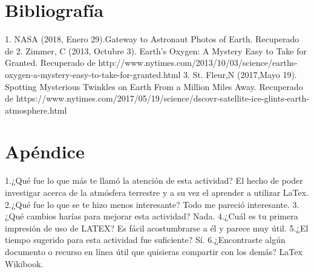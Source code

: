 \documentclass{article}
\begin{document}
\section{Bibliografía}
1. NASA (2018, Enero 29).Gateway to Astronaut Photos of Earth. Recuperado de 
2. Zimmer, C (2013, Octubre 3). Earth's Oxygen: A Mystery Easy to Take for Granted. Recuperado de http://www.nytimes.com/2013/10/03/science/earths-oxygen-a-mystery-easy-to-take-for-granted.html
3. St. Fleur,N (2017,Mayo 19). Spotting Mysterious Twinkles on Earth From a Million Miles Away. Recuperado de https://www.nytimes.com/2017/05/19/science/dscovr-satellite-ice-glints-earth-atmosphere.html
\section{Apéndice}
1.¿Qué fue lo que más te llamó la atención de esta actividad?
El hecho de poder investigar acerca de la atmósfera terrestre y a su vez el aprender a utilizar LaTex.
2.¿Qué fue lo que se te hizo menos interesante?
Todo me pareció interesante.
3.¿Qué cambios harías para mejorar esta actividad? 
Nada.
4.¿Cuál es tu primera impresión de uso de LATEX?
Es fácil acostumbrarse a él y parece muy útil.
5.¿El tiempo sugerido para esta actividad fue suficiente? 
Sí.
6.¿Encontraste algún documento o recurso en línea útil que quisieras compartir con los demás? 
LaTex Wikibook.
\end{document}
